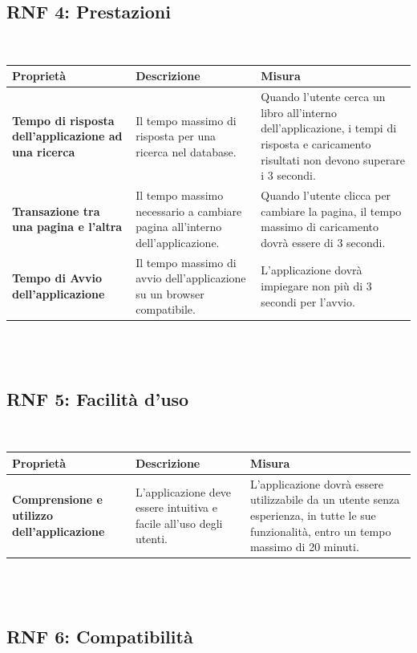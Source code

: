 \documentclass{article}
\begin{document}
\subsection{RNF 4: Prestazioni}\\

\begin{tabular}{|p{4cm}|p{6cm}|p{4cm}|}
\hline
\textbf{Proprietà} & \textbf{Descrizione} & \textbf{Misura} \\
\hline
\textbf{Tempo di risposta dell'applicazione ad una ricerca} & Il tempo massimo di risposta per una ricerca nel database. & Quando l’utente cerca un libro all’interno dell’applicazione, i tempi di risposta e caricamento risultati non devono superare i 3 secondi. \\
\hline
\textbf{Transazione tra una pagina e l’altra} & Il tempo massimo necessario a cambiare pagina all’interno dell’applicazione. & Quando l’utente clicca per cambiare la pagina, il tempo massimo di caricamento dovrà essere di 3 secondi. \\
\hline
\textbf{Tempo di Avvio dell’applicazione} & Il tempo massimo di avvio dell’applicazione su un browser compatibile. & L’applicazione dovrà impiegare non più di 3 secondi per l’avvio. \\
\hline
\end{tabular}\\\\

\subsection{RNF 5: Facilità d'uso}\\

\begin{tabular}{|p{4cm}|p{6cm}|p{4cm}|}
\hline
\textbf{Proprietà} & \textbf{Descrizione} & \textbf{Misura} \\
\hline
\textbf{Comprensione e utilizzo dell’applicazione} & L’applicazione deve essere intuitiva e facile all’uso degli utenti. & L’applicazione dovrà essere utilizzabile da un utente senza esperienza, in tutte le sue funzionalità, entro un tempo massimo di 20 minuti. \\
\hline
\end{tabular}\\\\

\subsection{RNF 6: Compatibilità}\\ 
\end{document}
